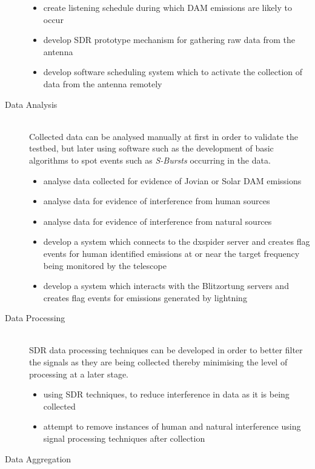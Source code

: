 \documentclass[runningheads,a4paper]{llncs}
\begin{document}
\begin{description}
\begin{itemize}
      \item create listening schedule during which \gls{DAM} emissions are likely to occur
      \item develop \gls{SDR} prototype mechanism for gathering raw data from the antenna
      \item develop software scheduling system which to activate the collection of data from the antenna remotely\\
    \end{itemize}
  \item [Data Analysis] \hfill \\
    Collected data can be analysed manually at first in order to validate the testbed, but later using software such as the development of basic algorithms to spot events such as \textit{S-Bursts} occurring in the data.
    \begin{itemize}
      \item analyse data collected for evidence of Jovian or Solar \gls{DAM} emissions
      \item analyse data for evidence of interference from human sources
      \item analyse data for evidence of interference from natural sources
      \item develop a system which connects to the dxspider server and creates flag events for human identified emissions at or near the target frequency being monitored by the telescope
      \item develop a system which interacts with the Blitzortung servers and creates flag events for emissions generated by lightning \\
    \end{itemize}
  \item [Data Processing] \hfill \\
    \gls{SDR} data processing techniques can be developed in order to better filter the signals as they are being collected thereby minimising the level of processing at a later stage.
    \begin{itemize}
      \item using \gls{SDR} techniques, to reduce interference in data as it is being collected
      \item attempt to remove instances of human and natural interference using signal processing techniques after collection \\
    \end{itemize}
  \item [Data Aggregation] \hfill \\

\end{description}
\end{document}
